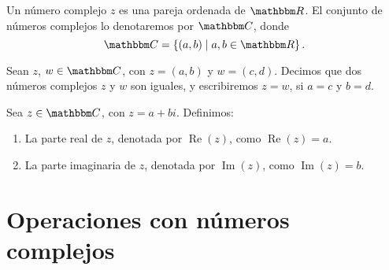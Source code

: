 \begin{definition}\label{definicion:definiciondecomplejo}
    Un número complejo $z$ es una pareja ordenada de $\RR$. El conjunto de números complejos lo denotaremos por $\CC$, donde
    $$\CC=\left\{ (a,  b) \mid a,  b \in \RR \right\} .$$
\end{definition}

\begin{definition}
    Sean $z$, $w \in \CC$, con $z=(a,  b)$ y $w=(c,  d)$. Decimos que dos números complejos $z$ y $w$ son iguales, y escribiremos $z=w$, si $a=c$ y $b=d$.
\end{definition}

\begin{definition}
    Sea $z \in \CC$, con $z=a+bi$. Definimos:
    \begin{enumerate}[label=\roman*.]
        \item La parte real de $z$, denotada por $\operatorname{Re}  (z)$, como $\operatorname{Re} (z)=a$.
        \item La parte imaginaria de $z$, denotada por $\operatorname{Im} (z)$, como $\operatorname{Im} (z)=b$.
    \end{enumerate}
\end{definition}

\section{Operaciones con números complejos}

